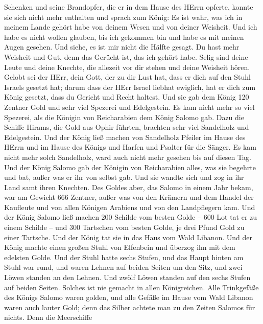 Schenken und seine Brandopfer, die er in dem Hause des HErrn opferte,
konnte sie sich nicht mehr enthalten  und sprach zum König:
Es ist wahr, was ich in meinem Lande gehört habe von deinem Wesen und
von deiner Weisheit.  Und ich habe es nicht wollen glauben,
bis ich gekommen bin und habe es mit meinen Augen gesehen. Und siehe, es
ist mir nicht die Hälfte gesagt. Du hast mehr Weisheit und Gut, denn das
Gerücht ist, das ich gehört habe.  Selig sind deine Leute
und deine Knechte, die allezeit vor dir stehen und deine Weisheit hören.
 Gelobt sei der HErr, dein Gott, der zu dir Lust hat, dass
er dich auf den Stuhl Israels gesetzt hat; darum dass der HErr Israel
liebhat ewiglich, hat er dich zum König gesetzt, dass du Gericht und
Recht haltest.  Und sie gab dem König 120 Zentner Gold und
sehr viel Spezerei und Edelgestein. Es kam nicht mehr so viel Spezerei,
als die Königin von Reicharabien dem König Salomo gab. 
Dazu die Schiffe Hirams, die Gold aus Ophir führten, brachten sehr viel
Sandelholz und Edelgestein.  Und der König ließ machen von
Sandelholz Pfeiler im Hause des HErrn und im Hause des Königs und Harfen
und Psalter für die Sänger. Es kam nicht mehr solch Sandelholz, ward
auch nicht mehr gesehen bis auf diesen Tag.  Und der König
Salomo gab der Königin von Reicharabien alles, was sie begehrte und bat,
außer was er ihr von selbst gab. Und sie wandte sich und zog in ihr Land
samt ihren Knechten.  Des Goldes aber, das Salomo in einem
Jahr bekam, war am Gewicht 666 Zentner,  außer was von den
Krämern und dem Handel der Kaufleute und von allen Königen Arabiens und
von den Landpflegern kam.  Und der König Salomo ließ machen
200 Schilde vom besten Golde -- 600 Lot tat er zu einem Schilde --
 und 300 Tartschen vom besten Golde, je drei Pfund Gold zu
einer Tartsche. Und der König tat sie in das Haus vom Wald Libanon.
 Und der König machte einen großen Stuhl von Elfenbein und
überzog ihn mit dem edelsten Golde.  Und der Stuhl hatte
sechs Stufen, und das Haupt hinten am Stuhl war rund, und waren Lehnen
auf beiden Seiten um den Sitz, und zwei Löwen standen an den Lehnen.
 Und zwölf Löwen standen auf den sechs Stufen auf beiden
Seiten. Solches ist nie gemacht in allen Königreichen. 
Alle Trinkgefäße des Königs Salomo waren golden, und alle Gefäße im
Hause vom Wald Libanon waren auch lauter Gold; denn das Silber achtete
man zu den Zeiten Salomos für nichts.  Denn die Meerschiffe
